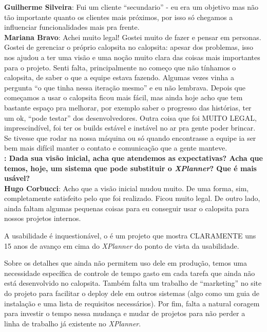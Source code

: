 \textbf{Guilherme Silveira}: Fui um cliente ``secundario'' - eu era um objetivo mas não tão importante quanto os clientes mais próximos, por isso só chegamos a influenciar funcionalidades mais pra frente. \\

\textbf{Mariana Bravo}: Achei muito legal!
Gostei muito de fazer e pensar em personas. Gostei de gerenciar o próprio calopsita no calopsita: apesar dos problemas, isso nos ajudou a ter uma visão e uma noção muito clara das coisas mais importantes para o projeto.
Senti falta, principalmente no começo que não tínhamos o calopsita, de saber o que a equipe estava fazendo. Algumas vezes vinha a pergunta ``o que tinha nessa iteração mesmo'' e eu não lembrava.
Depois que começamos a usar o calopsita ficou mais fácil, mas ainda hoje acho que tem bastante espaço pra melhorar, por exemplo saber o progresso das histórias, ter um ok, ``pode testar'' dos desenvolvedores.
Outra coisa que foi MUITO LEGAL, imprescindível, foi ter os builds estável e instável no ar pra gente poder brincar. Se tivesse que rodar na nossa máquina ou só quando encontrasse a equipe ia ser bem mais difícil manter o contato e comunicação que a gente manteve. \\

\textbf{\textit{\calopsita{}}: Dada sua visão inicial, acha que atendemos as expectativas? Acha que temos, hoje, um sistema que pode substituir o \textit{XPlanner}? Que é mais usável?}\\

\textbf{Hugo Corbucci}: Acho que a visão inicial mudou muito. De uma forma, sim, completamente satisfeito pelo que foi realizado. Ficou muito legal. De outro lado, ainda faltam algumas pequenas coisas para eu conseguir usar o calopsita para nossos projetos internos.

A usabilidade é inquestionável, o \calopsita{} é um projeto que mostra CLARAMENTE uns 15 anos de avanço em cima do \textit{XPlanner} do ponto de vista da usabilidade.

Sobre os detalhes que ainda não permitem uso dele em produção, temos uma necessidade específica de controle de tempo gasto em cada tarefa que ainda não está desenvolvido no calopsita. Também falta um trabalho de ``marketing'' no site do projeto para facilitar o deploy dele em outros sistemas (algo como um guia de instalação e uma lista de requisitos necessários). Por fim, falta a natural coragem para investir o tempo nessa mudança e mudar de projetos para não perder a linha de trabalho já existente no \textit{XPlanner}.\\

